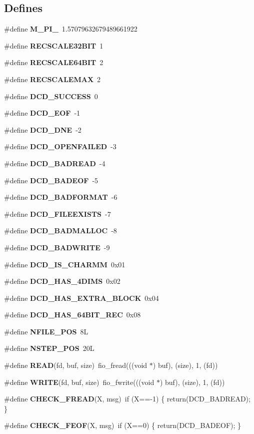 \subsection*{Defines}
\begin{CompactItemize}
\item 
\#define {\bf M\_\-PI\_}\ 1.57079632679489661922
\item 
\#define {\bf RECSCALE32BIT}\ 1
\item 
\#define {\bf RECSCALE64BIT}\ 2
\item 
\#define {\bf RECSCALEMAX}\ 2
\item 
\#define {\bf DCD\_\-SUCCESS}\ 0
\item 
\#define {\bf DCD\_\-EOF}\ -1
\item 
\#define {\bf DCD\_\-DNE}\ -2
\item 
\#define {\bf DCD\_\-OPENFAILED}\ -3
\item 
\#define {\bf DCD\_\-BADREAD}\ -4
\item 
\#define {\bf DCD\_\-BADEOF}\ -5
\item 
\#define {\bf DCD\_\-BADFORMAT}\ -6
\item 
\#define {\bf DCD\_\-FILEEXISTS}\ -7
\item 
\#define {\bf DCD\_\-BADMALLOC}\ -8
\item 
\#define {\bf DCD\_\-BADWRITE}\ -9
\item 
\#define {\bf DCD\_\-IS\_\-CHARMM}\ 0x01
\item 
\#define {\bf DCD\_\-HAS\_\-4DIMS}\ 0x02
\item 
\#define {\bf DCD\_\-HAS\_\-EXTRA\_\-BLOCK}\ 0x04
\item 
\#define {\bf DCD\_\-HAS\_\-64BIT\_\-REC}\ 0x08
\item 
\#define {\bf NFILE\_\-POS}\ 8L
\item 
\#define {\bf NSTEP\_\-POS}\ 20L
\item 
\#define {\bf READ}(fd, buf, size)\ fio\_\-fread(((void $\ast$) buf), (size), 1, (fd))
\item 
\#define {\bf WRITE}(fd, buf, size)\ fio\_\-fwrite(((void $\ast$) buf), (size), 1, (fd))
\item 
\#define {\bf CHECK\_\-FREAD}(X, msg)\ if (X==-1) \{ return(DCD\_\-BADREAD); \}
\item 
\#define {\bf CHECK\_\-FEOF}(X, msg)\ if (X==0)  \{ return(DCD\_\-BADEOF); \}
\end{CompactItemize}
